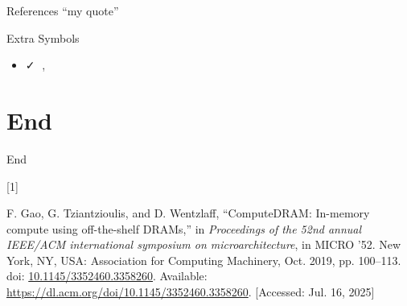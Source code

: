 \documentclass[
  ignorenonframetext,
  twocolumn]{beamer}
\newlength{\cslhangindent}
\newlength{\csllabelwidth}
\newenvironment{CSLReferences}[2] %
 {\begin{list}{}{%
  \setlength{\itemindent}{0pt}
  \setlength{\leftmargin}{0pt}
  \setlength{\parsep}{0pt}
  \ifodd #1
   \setlength{\leftmargin}{\cslhangindent}
   \setlength{\itemindent}{-1\cslhangindent}
  \fi
  \setlength{\itemsep}{#2\baselineskip}}}
 {\end{list}}
\newcommand{\CSLLeftMargin}[1]{\parbox[t]{\csllabelwidth}{\strut#1\strut}}
\newcommand{\CSLRightInline}[1]{\parbox[t]{\linewidth - \csllabelwidth}{\strut#1\strut}}
\providecommand{\tightlist}{%
  \setlength{\itemsep}{0pt}\setlength{\parskip}{0pt}}
\newcommand{\emoji}[1]{{\emojiFont #1}}
\begin{document}
\begin{frame}{References}
\protect{}\label{references}
``my quote'' 
\end{frame}

\begin{frame}{Extra Symbols}
\protect{}\label{extra-symbols}
\begin{itemize}
\tightlist
\item
  ✓ \emoji{🧠}, \emoji{📙}
\end{itemize}
\end{frame}

\section{End}\label{end}

\begin{frame}{End}
\protect{}\label{refs}
\begin{CSLReferences}{0}{0}
\CSLLeftMargin{{[}1{]} }%
\CSLRightInline{F. Gao, G. Tziantzioulis, and D. Wentzlaff,
{``ComputeDRAM: In-memory compute using off-the-shelf DRAMs,''} in
\emph{Proceedings of the 52nd annual IEEE/ACM international symposium on
microarchitecture}, in MICRO '52. New York, NY, USA: Association for
Computing Machinery, Oct. 2019, pp. 100--113. doi:
\href{https://doi.org/10.1145/3352460.3358260}{10.1145/3352460.3358260}.
Available: \url{https://dl.acm.org/doi/10.1145/3352460.3358260}.
{[}Accessed: Jul. 16, 2025{]}}

\end{CSLReferences}
\end{frame}
\end{document}
